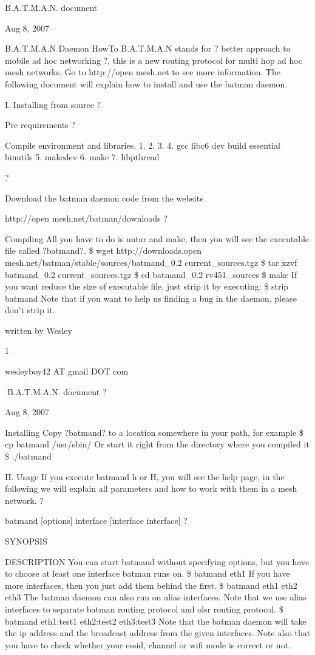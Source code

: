 \documentclass[
	12pt,
	a4paper,
	twoside,
	english,
	headsepline,
	footnosepline,
	automark,
	normalheadings,
	openany,
	cleardoubleplain,
	abstracton,
	idxtotoc,
	liststotoc,
	bibtotoc,
 	BCOR8mm,
]{scrartcl}
\title{\dctitle}
\author{\dcauthorfirstname~\dcauthorlastname}
\begin{document}
\maketitle
B.A.T.M.A.N. document

Aug 8, 2007

B.A.T.M.A.N    Daemon   HowTo
B.A.T.M.A.N stands for ? better approach to mobile ad hoc networking ?, this is a new  routing protocol for multi hop ad hoc mesh networks. Go to http://open mesh.net to see  more information. The following document will explain how to install and use the batman daemon.

I.  Installing from source
?

Pre requirements
?

Compile environment and libraries. 1. 2. 3. 4. gcc  libc6 dev build essential  binutils 5. makedev 6. make 7. libpthread

?

Download the batman daemon code from the website

 http://open mesh.net/batman/downloads
?

Compiling
All you have to do is untar and make, then you will see the executable file called ?batmand?. \$ wget http://downloads.open mesh.net/batman/stable/sources/batmand\_0.2  current\_sources.tgz \$ tar xzvf batmand\_0.2 current\_sources.tgz \$ cd batmand\_0.2 rv451\_sources \$ make If you want reduce the size of executable file, just strip it by executing:  \$ strip batmand Note that if you want to help us finding a bug in the daemon, please don't strip it.

written by Wesley

1

wesleyboy42 AT gmail DOT com

B.A.T.M.A.N. document
?

Aug 8, 2007

Installing
Copy ?batmand? to a location somewhere in your path, for example \$ cp batmand /usr/sbin/ Or start it right from the directory where you compiled it \$ ./batmand

II. Usage
If you execute batmand  h or  H, you will see the help page, in the following we will explain  all parameters and how to work with them in a mesh network.
?

batmand [options] interface [interface interface]
?

SYNOPSIS

DESCRIPTION
You can start batmand without specifying options, but you have to choose at least one  interface batman runs on. \$ batmand eth1 If you have more interfaces, then you just add them behind the first. \$ batmand eth1 eth2 eth3 The batman daemon can also run on alias interfaces. Note that we use alias interfaces to separate batman routing protocol and olsr routing  protocol. \$ batmand eth1:test1 eth2:test2 eth3:test3 Note that the batman daemon will take the ip address and the broadcast address from the  given interfaces. Note also that you have to check whether your essid, channel or wifi mode is correct or not.
\end{document}
